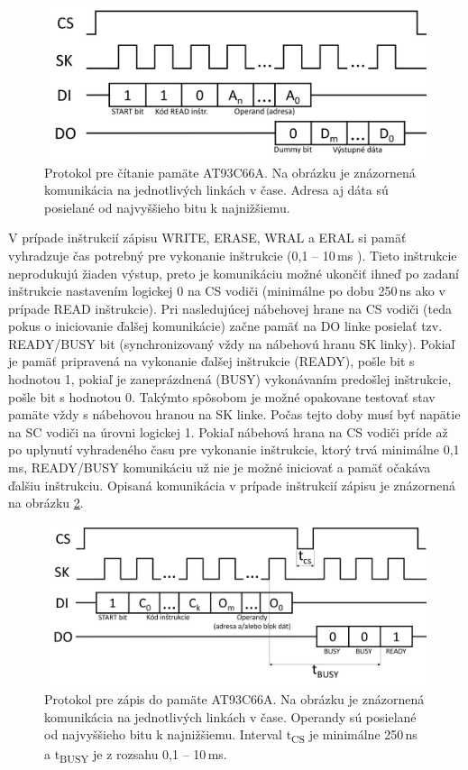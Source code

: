 \begin{figure}
    \centerline{\includegraphics[width=1\textwidth]{images/eepromREAD.png}}
    \caption[Protokol pre čítanie pamäte AT93C66A]{Protokol pre čítanie pamäte AT93C66A. Na obrázku je znázornená komunikácia na jednotlivých linkách v čase. Adresa aj dáta sú posielané od najvyššieho bitu k najnižšiemu.}
    \label{obr:eepromREAD}
\end{figure}

V prípade inštrukcií zápisu WRITE, ERASE, WRAL a ERAL si pamäť vyhradzuje čas potrebný pre vykonanie inštrukcie (0,1 -- 10\,ms \cite{eepromDatasheet}). Tieto inštrukcie neprodukujú žiaden výstup, preto je komunikáciu možné ukončiť ihneď po zadaní inštrukcie nastavením logickej 0 na CS vodiči (minimálne po dobu 250\,ns ako v prípade READ inštrukcie). Pri nasledujúcej nábehovej hrane na CS vodiči (teda pokus o iniciovanie ďalšej komunikácie) začne pamäť na DO linke posielať tzv. READY/BUSY bit (synchronizovaný vždy na nábehovú hranu SK linky). Pokiaľ je pamäť pripravená na vykonanie ďalšej inštrukcie (READY), pošle bit s hodnotou 1, pokiaľ je zaneprázdnená (BUSY) vykonávaním predošlej inštrukcie, pošle bit s hodnotou 0. Takýmto spôsobom je možné opakovane testovať stav pamäte vždy s nábehovou hranou na SK linke. Počas tejto doby musí byť napätie na SC vodiči na úrovni logickej 1. Pokiaľ nábehová hrana na CS vodiči príde až po uplynutí vyhradeného času pre vykonanie inštrukcie, ktorý trvá minimálne 0,1\,ms, READY/BUSY komunikáciu už nie je možné iniciovať a pamäť očakáva ďalšiu inštrukciu. Opisaná komunikácia v prípade inštrukcií zápisu je znázornená na obrázku \ref{obr:eepromWRITE}.

\begin{figure}[h!]
    \centerline{\includegraphics[width=1\textwidth]{images/eepromWRITE.png}}
    \caption[Protokol pre zápis do pamäte AT93C66A]{Protokol pre zápis do pamäte AT93C66A. Na obrázku je znázornená komunikácia na jednotlivých linkách v čase. Operandy sú posielané od najvyššieho bitu k najnižšiemu. Interval t\textsubscript{CS} je minimálne 250\,ns a t\textsubscript{BUSY} je z rozsahu 0,1 -- 10\,ms.}
    \label{obr:eepromWRITE}
\end{figure}


